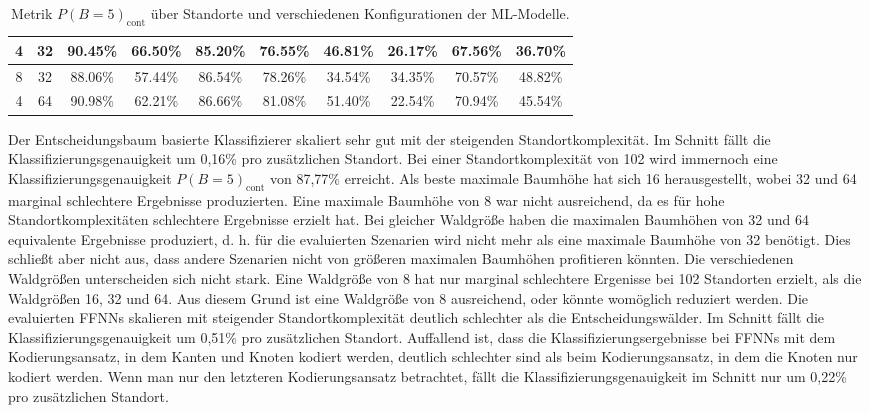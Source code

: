 \begin{table}[h!]
\begin{tabular}{ | c | c | c | c | c | c | c | c | c | c | }
        4 & 32 & 90.45\% & 66.50\% & 85.20\% & 76.55\% & 46.81\% & 26.17\% & 67.56\% & 36.70\% \\\hline
        8 & 32 & 88.06\% & 57.44\% & 86.54\% & 78.26\% & 34.54\% & 34.35\% & 70.57\% & 48.82\% \\\hline
        4 & 64 & 90.98\% & 62.21\% & 86.66\% & 81.08\% & 51.40\% & 22.54\% & 70.94\% & 45.54\% \\\hline
    \end{tabular}
    \caption{Metrik $P(B=5)_{\text{cont}}$ über Standorte und verschiedenen Konfigurationen der ML-Modelle.}
    \label{tab:predictions_by_acc_5_cont}
\end{table}
\newline
\newline
Der Entscheidungsbaum basierte Klassifizierer skaliert sehr gut mit der steigenden Standortkomplexität.
Im Schnitt fällt die Klassifizierungsgenauigkeit um 0,16\% pro zusätzlichen Standort.
Bei einer Standortkomplexität von 102 wird immernoch eine Klassifizierungsgenauigkeit $P(B=5)_{\text{cont}}$ von 87,77\% erreicht.
Als beste maximale Baumhöhe hat sich 16 herausgestellt, wobei 32 und 64 marginal schlechtere Ergebnisse produzierten.
Eine maximale Baumhöhe von 8 war nicht ausreichend, da es für hohe Standortkomplexitäten schlechtere Ergebnisse erzielt hat.
Bei gleicher Waldgröße haben die maximalen Baumhöhen von 32 und 64 equivalente Ergebnisse produziert,
d. h. für die evaluierten Szenarien wird nicht mehr als eine maximale Baumhöhe von 32 benötigt.
Dies schließt aber nicht aus, dass andere Szenarien nicht von größeren maximalen Baumhöhen profitieren könnten.
Die verschiedenen Waldgrößen unterscheiden sich nicht stark.
Eine Waldgröße von 8 hat nur marginal schlechtere Ergenisse bei 102 Standorten erzielt, als die Waldgrößen 16, 32 und 64.
Aus diesem Grund ist eine Waldgröße von 8 ausreichend, oder könnte womöglich reduziert werden.
\newline
\newline
Die evaluierten FFNNs skalieren mit steigender Standortkomplexität deutlich schlechter als die Entscheidungswälder.
Im Schnitt fällt die Klassifizierungsgenauigkeit um 0,51\% pro zusätzlichen Standort.
Auffallend ist, dass die Klassifizierungsergebnisse bei FFNNs mit dem Kodierungsansatz, in dem Kanten und Knoten kodiert werden,
deutlich schlechter sind als beim Kodierungsansatz, in dem die Knoten nur kodiert werden.
Wenn man nur den letzteren Kodierungsansatz betrachtet, fällt die Klassifizierungsgenauigkeit im Schnitt nur um 0,22\% pro zusätzlichen Standort.
